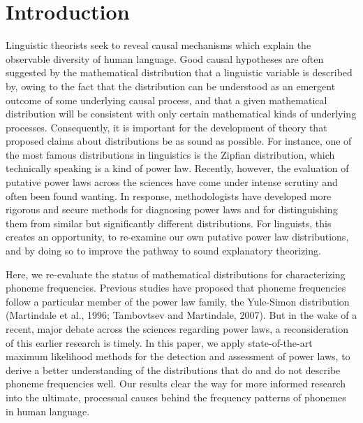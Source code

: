 

\hypertarget{introduction}{%
\section*{Introduction}\label{introduction}}

Linguistic theorists seek to reveal causal mechanisms which explain the observable diversity of human language. Good causal hypotheses are often suggested by the mathematical distribution that a linguistic variable is described by, owing to the fact that the distribution can be understood as an emergent outcome of some underlying causal process, and that a given mathematical distribution will be consistent with only certain mathematical kinds of underlying processes. Consequently, it is important for the development of theory that proposed claims about distributions be as sound as possible. For instance, one of the most famous distributions in linguistics is the Zipfian distribution, which technically speaking is a kind of power law. Recently, however, the evaluation of putative power laws across the sciences have come under intense scrutiny and often been found wanting. In response, methodologists have developed more rigorous and secure methods for diagnosing power laws and for distinguishing them from similar but significantly different distributions. For linguists, this creates an opportunity, to re-examine our own putative power law distributions, and by doing so to improve the pathway to sound explanatory theorizing.

Here, we re-evaluate the status of mathematical distributions for characterizing phoneme frequencies. Previous studies have proposed that phoneme frequencies follow a particular member of the power law family, the Yule-Simon distribution (Martindale et al., 1996; Tambovtsev and Martindale, 2007). But in the wake of a recent, major debate across the sciences regarding power laws, a reconsideration of this earlier research is timely. In this paper, we apply state-of-the-art maximum likelihood methods for the detection and assessment of power laws, to derive a better understanding of the distributions that do and do not describe phoneme frequencies well. Our results clear the way for more informed research into the ultimate, processual causes behind the frequency patterns of phonemes in human language.

